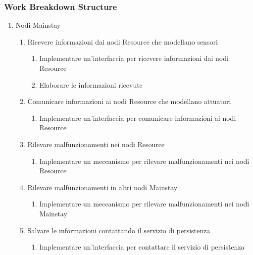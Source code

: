 \subsubsection{Work Breakdown Structure}

\begin{enumerate}
    \item Nodi Mainstay
          \begin{enumerate}
              \item Ricevere informazioni dai nodi Resource che modellano sensori
                    \begin{enumerate}
                        \item Implementare un'interfaccia per ricevere informazioni dai nodi Resource
                        \item Elaborare le informazioni ricevute
                    \end{enumerate}
              \item Comunicare informazioni ai nodi Resource che modellano attuatori
                    \begin{enumerate}
                        \item Implementare un'interfaccia per comunicare informazioni ai nodi Resource
                    \end{enumerate}
              \item Rilevare malfunzionamenti nei nodi Resource
                    \begin{enumerate}
                        \item Implementare un meccanismo per rilevare malfunzionamenti nei nodi Resource
                    \end{enumerate}
              \item Rilevare malfunzionamenti in altri nodi Mainstay
                    \begin{enumerate}
                        \item Implementare un meccanismo per rilevare malfunzionamenti nei nodi Mainstay
                    \end{enumerate}
              \item Salvare le informazioni contattando il servizio di persistenza
                    \begin{enumerate}
                        \item Implementare un'interfaccia per contattare il servizio di persistenza
                    \end{enumerate}

\end{enumerate}
\end{enumerate}
